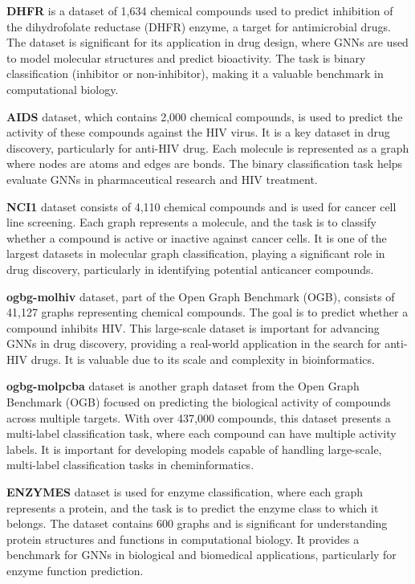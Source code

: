 \textbf{DHFR} \cite{BZR_COX_DHFR} is a dataset of 1,634 chemical compounds used to predict inhibition of the dihydrofolate reductase (DHFR) enzyme, a target for antimicrobial drugs. The dataset is significant for its application in drug design, where GNNs are used to model molecular structures and predict bioactivity. The task is binary classification (inhibitor or non-inhibitor), making it a valuable benchmark in computational biology.

\textbf{AIDS} \cite{AIDS} dataset, which contains 2,000 chemical compounds, is used to predict the activity of these compounds against the HIV virus. It is a key dataset in drug discovery, particularly for anti-HIV drug. Each molecule is represented as a graph where nodes are atoms and edges are bonds. The binary classification task helps evaluate GNNs in pharmaceutical research and HIV treatment.


\textbf{NCI1} \cite{NCI1} dataset consists of 4,110 chemical compounds and is used for cancer cell line screening. Each graph represents a molecule, and the task is to classify whether a compound is active or inactive against cancer cells. It is one of the largest datasets in molecular graph classification, playing a significant role in drug discovery, particularly in identifying potential anticancer compounds.

\textbf{ogbg-molhiv} \cite{hu2020ogb} dataset, part of the Open Graph Benchmark (OGB), consists of 41,127 graphs representing chemical compounds. The goal is to predict whether a compound inhibits HIV. This large-scale dataset is important for advancing GNNs in drug discovery, providing a real-world application in the search for anti-HIV drugs. It is valuable due to its scale and complexity in bioinformatics.

\textbf{ogbg-molpcba} \cite{hu2020ogb} dataset is another graph dataset from the Open Graph Benchmark (OGB) focused on predicting the biological activity of compounds across multiple targets. With over 437,000 compounds, this dataset presents a multi-label classification task, where each compound can have multiple activity labels. It is important for developing models capable of handling large-scale, multi-label classification tasks in cheminformatics.

\textbf{ENZYMES} \cite{chen2024fedgl} dataset is used for enzyme classification, where each graph represents a protein, and the task is to predict the enzyme class to which it belongs. The dataset contains 600 graphs and is significant for understanding protein structures and functions in computational biology. It provides a benchmark for GNNs in biological and biomedical applications, particularly for enzyme function prediction.

